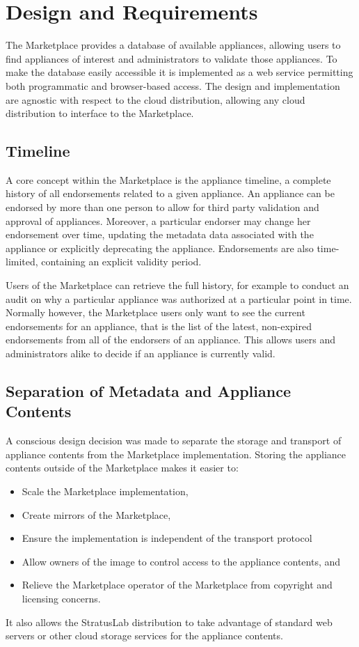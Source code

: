\section{Design and Requirements}
\label{sec:design}

The Marketplace provides a database of available appliances, allowing
users to find appliances of interest and administrators to validate
those appliances.  To make the database easily accessible it is
implemented as a web service permitting both programmatic and
browser-based access.  The design and implementation are agnostic with
respect to the cloud distribution, allowing any cloud distribution to
interface to the Marketplace\@.

\subsection{Timeline}

A core concept within the Marketplace is the appliance timeline, a
complete history of all endorsements related to a given appliance.  An
appliance can be endorsed by more than one person to allow for third
party validation and approval of appliances.  Moreover, a particular
endorser may change her endorsement over time, updating the metadata
data associated with the appliance or explicitly deprecating the
appliance.  Endorsements are also time-limited, containing an explicit
validity period.

Users of the Marketplace can retrieve the full history, for example to
conduct an audit on why a particular appliance was authorized at a
particular point in time.  Normally however, the Marketplace users
only want to see the current endorsements for an appliance, that is
the list of the latest, non-expired endorsements from all of the
endorsers of an appliance.  This allows users and administrators alike
to decide if an appliance is currently valid.

\subsection{Separation of Metadata and Appliance Contents}

A conscious design decision was made to separate the storage and
transport of appliance contents from the Marketplace implementation.
Storing the appliance contents outside of the Marketplace makes it
easier to:
\begin{itemize}
\item Scale the Marketplace implementation,
\item Create mirrors of the Marketplace,
\item Ensure the implementation is independent of the transport
  protocol
\item Allow owners of the image to control access to the appliance
  contents, and
\item Relieve the Marketplace operator of the Marketplace from
  copyright and licensing concerns.
\end{itemize}
It also allows the StratusLab distribution to take advantage of
standard web servers or other cloud storage services for the appliance
contents.

